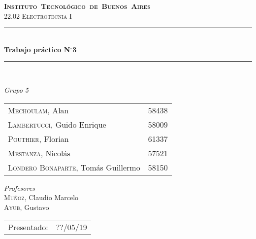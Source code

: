 \begin{titlepage}
\newcommand{\HRule}{\rule{\linewidth}{0.5mm}}
\center
\mbox{\textsc{\LARGE \bfseries {Instituto Tecnológico de Buenos Aires}}}\\[1.5cm]
\textsc{\Large 22.02 Electrotecnia I}\\[0.5cm]


\HRule \\[0.6cm]
{ \Huge \bfseries Trabajo práctico N$^{\circ}$3}\\[0.4cm] 
\HRule \\[1.5cm]


{\large

\emph{Grupo 5}\\
\vspace{3px}

\begin{tabular}{lr} 	
\textsc{Mechoulam}, Alan  &  58438\\
\textsc{Lambertucci}, Guido Enrique  & 58009 \\
\textsc{Pouthier}, Florian  & 61337 \\
\textsc{Mestanza}, Nicolás  & 57521 \\
\textsc{Londero Bonaparte}, Tomás Guillermo  & 58150 \\
\end{tabular}

\vspace{20px}

\emph{Profesores}\\
\vspace{3px}
\textsc{Muñoz}, Claudio Marcelo\\ 	
\textsc{Ayub}, Gustavo\\ 	

\vspace{100px}

\begin{tabular}{ll}

Presentado: & ??/05/19\\

\end{tabular}

}

\vfill

\end{titlepage}
